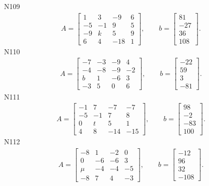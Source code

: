 \documentclass[11pt]{report}
\begin{document}
N109
\begin{align*}
 A = \left[\begin{matrix}1 & 3 & -9 & 6\\-5 & -1 & 9 & 5\\-9 & k & 5 & 9\\6 & 4 & -18 & 1\end{matrix}\right],
\qquad b = \left[\begin{matrix}81\\-27\\36\\108\end{matrix}\right]. 
 \end{align*}
N110
\begin{align*}
 A = \left[\begin{matrix}-7 & -3 & -9 & 4\\-4 & -8 & -9 & -2\\b & 1 & -6 & 3\\-3 & 5 & 0 & 6\end{matrix}\right],
\qquad b = \left[\begin{matrix}-22\\59\\3\\-81\end{matrix}\right]. 
 \end{align*}
N111
\begin{align*}
 A = \left[\begin{matrix}-1 & 7 & -7 & -7\\-5 & -1 & 7 & 8\\0 & t & 5 & 1\\4 & 8 & -14 & -15\end{matrix}\right],
\qquad b = \left[\begin{matrix}98\\-2\\-83\\100\end{matrix}\right]. 
 \end{align*}
N112
\begin{align*}
 A = \left[\begin{matrix}-8 & 1 & -2 & 0\\0 & -6 & -6 & 3\\\mu & -4 & -4 & -5\\-8 & 7 & 4 & -3\end{matrix}\right],
\qquad b = \left[\begin{matrix}-12\\96\\32\\-108\end{matrix}\right]. 
 \end{align*}
\end{document}
